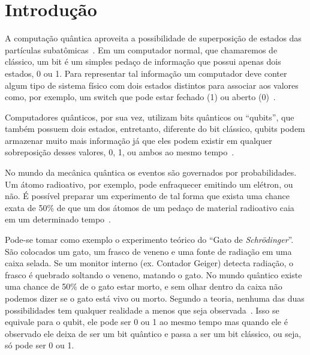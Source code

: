 \documentclass[a4paper, 12pt, oneside]{book}
\begin{document}
\tableofcontents

\thispagestyle{myheadings}


\listoffigures
{}

\thispagestyle{myheadings}





\pagebreak
{}

\chapter{Introdução}
\thispagestyle{empty}

A computação quântica aproveita a possibilidade de superposição de estados das partículas subatômicas~\cite{wiredQC}. Em um computador normal, que chamaremos de clássico, um bit é um simples pedaço de informação que possui apenas dois estados, 0 ou 1. Para representar tal informação um computador deve conter algum tipo de sistema físico com dois estados distintos para associar aos valores como, por exemplo, um switch que pode estar fechado (1) ou aberto (0)~\cite{mermin}.

Computadores quânticos, por sua vez, utilizam bits quânticos ou ``qubits'', que também possuem dois estados, entretanto, diferente do bit clássico, qubits podem armazenar muito mais informação já que eles podem existir em qualquer sobreposição desses valores, 0, 1, ou ambos ao mesmo tempo~\cite{wiredQC}. 

No mundo da mecânica quântica os eventos são governados por probabilidades. Um átomo radioativo, por exemplo, pode enfraquecer emitindo um elétron, ou não. É possível preparar um experimento de tal forma que exista uma chance exata de 50\% de que um dos átomos de um pedaço de material radioativo caia em um determinado tempo~\cite{gribbin}.

Pode-se tomar como exemplo o experimento teórico do ``Gato de \textit{Schrödinger}''. São colocados um gato, um frasco de veneno e uma fonte de radiação em uma caixa selada. Se um monitor interno (ex. Contador Geiger) detecta radiação, o frasco é quebrado soltando o veneno, matando o gato. No mundo quântico existe uma chance de 50\% de o gato estar morto, e sem olhar dentro da caixa não podemos dizer se o gato está vivo ou morto. Segundo a teoria, nenhuma das duas possibilidades tem qualquer realidade a menos que seja observada~\cite{gribbin}. Isso se equivale para o qubit, ele pode ser 0 ou 1 ao mesmo tempo mas quando ele é observado ele deixa de ser um bit quântico e passa a ser um bit clássico, ou seja, só pode ser 0 ou 1.
\end{document}

